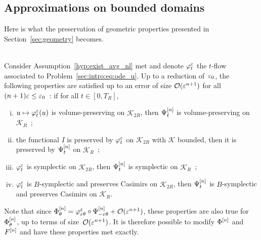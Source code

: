 \subsection{Approximations on bounded domains}
\label{sec:approx}


Here is what the preservation of geometric properties presented in
Section~\ref{sec:geometry} becomes. 

\begin{theorem}
\hspace*{1em} \\
  Consider Assumption~\ref{hyp:exist_avg_nl} met and denote
  $\varphi^\varepsilon _t$ the $t$-flow associated to
  Problem~\eqref{sec:intro:eq:ode_u}. Up to a reduction of~$\varepsilon_0$, the
  following properties are satisfied up to an error of size
  $\mathcal{O}(\varepsilon^{n+1})$ for all $(n+1)\varepsilon \leq \varepsilon_0$~: if for all $t
  \in [0, T_R]$, 
  \begin{enumerate}[(i)]
    \item $u \mapsto \varphi^\varepsilon _t(u)$ is volume-preserving on
    $\mathcal{K}_{2R}$, then $\Psi^{[n]} _t$ is volume-preserving on
    $\mathcal{K}_R$~;
    \item the functional $I$ is preserved by $\varphi^\varepsilon _t$ on
    $\mathcal{K}_{2R}$ with $\mathcal{K}$ bounded, then it is preserved
    by $\Psi^{[n]} _t$ on $\mathcal{K}_R$~; 
    \item $\varphi^\varepsilon _t$ is symplectic on $\mathcal{K}_{2R}$, then
    $\Psi^{[n]} _t$ is symplectic on $\mathcal{K}_R$~;
    \item $\varphi^\varepsilon _t$ is $B$-symplectic and preserves Casimirs on
    $\mathcal{K}_{2R}$, then $\Psi^{[n]} _t$ is $B$-symplectic and
    preserves Casimirs on $\mathcal{K}_R$.
  \end{enumerate}
  Note that since $\Phi^{[n]} _\theta = \varphi^\varepsilon _{\varepsilon\theta} \circ
  \Psi^{[n]} _{-\varepsilon\theta} + \mathcal{O}(\varepsilon^{n+1})$, these properties are
  also true for $\Phi^{[n]} _\theta$, up to terms of
  size~$\mathcal{O}(\varepsilon^{n+1})$. It is therefore possible to modify $\Phi^{[n]}$ and $F^{[n]}$ and have these properties met exactly.
\end{theorem}

